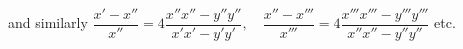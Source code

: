 \expandafter\def\csname HistoricalNoteText30\endcsname{and similarly
\(\dfrac{x'-x''}{x''}=4\dfrac{x''x''-y''y''}{x'x'-y'y'},\quad
\dfrac{x''-x'''}{x'''}=4\dfrac{x'''x'''-y'''y'''}{x''x''-y''y''}\) etc.
}
